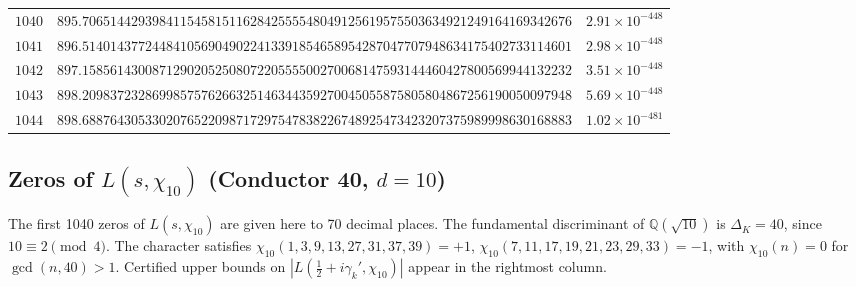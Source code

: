 \documentclass[12pt,reqno]{amsart}
\theoremstyle{remark}
\newcommand{\Q}{\mathbb{Q}}
\begin{document}
\begin{longtable}{clc}
$1040$ & $895.7065144293984115458151162842555548049125619575503634921249164169342676$ & $2.91\times 10^{-448}$ \\
$1041$ & $896.5140143772448410569049022413391854658954287047707948634175402733114601$ & $2.98\times 10^{-448}$ \\
$1042$ & $897.1585614300871290205250807220555500270068147593144460427800569944132232$ & $3.51\times 10^{-448}$ \\
$1043$ & $898.2098372328699857576266325146344359270045055875805804867256190050097948$ & $5.69\times 10^{-448}$ \\
$1044$ & $898.6887643053302076522098717297547838226748925473423207375989998630168883$ & $1.02\times 10^{-481}$ \\
\end{longtable}
\normalsize
\setlength{\LTleft}{0pt}
\setlength{\LTright}{0pt}

\subsection{Zeros of \texorpdfstring{$L(s,\chi_{10})$}{L(s,chi10)} (Conductor 40, \texorpdfstring{$d = 10$}{d=10})}
\label{subsec:chi10}

The first 1040 zeros of $L(s,\chi_{10})$ are given here to 70 decimal places.  The fundamental discriminant of $\Q(\sqrt{10})$ is $\Delta_K = 40$, since $10 \equiv 2 \pmod{4}$.  The character satisfies $\chi_{10}(1,3,9,13,27,31,37,39) = +1$, $\chi_{10}(7,11,17,19,21,23,29,33) = -1$, with $\chi_{10}(n) = 0$ for $\gcd(n,40) > 1$.  Certified upper bounds on $|L(\tfrac{1}{2}+i\gamma_k',\chi_{10})|$ appear in the rightmost column.
\end{document}
